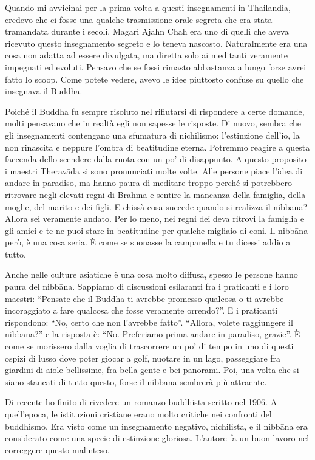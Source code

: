 Quando mi avvicinai per la prima volta a questi insegnamenti in Thailandia, credevo che ci fosse una qualche trasmissione orale segreta che era stata tramandata durante i secoli. Magari Ajahn Chah era uno di quelli che aveva ricevuto questo insegnamento segreto e lo teneva nascosto. Naturalmente era una cosa non adatta ad essere divulgata, ma diretta solo ai meditanti veramente impegnati ed evoluti. Pensavo che se fossi rimasto abbastanza a lungo forse avrei fatto lo scoop. Come potete vedere, avevo le idee piuttosto confuse su quello che insegnava il Buddha. 

Poiché il Buddha fu sempre risoluto nel rifiutarsi di rispondere a certe domande, molti pensavano che in realtà egli non sapesse le risposte. Di nuovo, sembra che gli insegnamenti contengano una sfumatura di nichilismo: l'estinzione dell'io, la non rinascita e neppure l'ombra di beatitudine eterna. Potremmo reagire a questa faccenda dello scendere dalla ruota con un po' di disappunto. A questo proposito i maestri Theravāda si sono pronunciati molte volte. Alle persone piace l'idea di andare in paradiso, ma hanno paura di meditare troppo perché si potrebbero ritrovare negli elevati regni di Brahmā e sentire la mancanza della famiglia, della moglie, del marito e dei figli. E chissà cosa succede quando si realizza il nibbāna? Allora sei veramente andato. Per lo meno, nei regni dei deva ritrovi la famiglia e gli amici e te ne puoi stare in beatitudine per qualche migliaio di eoni. Il nibbāna però, è una cosa seria. È come se suonasse la campanella e tu dicessi addio a tutto.

Anche nelle culture asiatiche è una cosa molto diffusa, spesso le persone hanno paura del nibbāna. Sappiamo di discussioni esilaranti fra i praticanti e i loro maestri: ``Pensate che il Buddha ti avrebbe promesso qualcosa o ti avrebbe incoraggiato a fare qualcosa che fosse veramente orrendo?''. E i praticanti rispondono: ``No, certo che non l'avrebbe fatto''. ``Allora, volete raggiungere il nibbāna?'' e la risposta è: ``No. Preferiamo prima andare in paradiso, grazie''. È come se morissero dalla voglia di trascorrere un po' di tempo in uno di questi ospizi di lusso dove poter giocar a golf, nuotare in un lago, passeggiare fra giardini di aiole bellissime, fra bella gente e bei panorami. Poi, una volta che si siano stancati di tutto questo, forse il nibbāna sembrerà più attraente. 

Di recente ho finito di rivedere un romanzo buddhista scritto nel 1906. A quell'epoca, le istituzioni cristiane erano molto critiche nei confronti del buddhismo. Era visto come un insegnamento negativo, nichilista, e il nibbāna era considerato come una specie di estinzione gloriosa. L'autore fa un buon lavoro nel correggere questo malinteso. 


